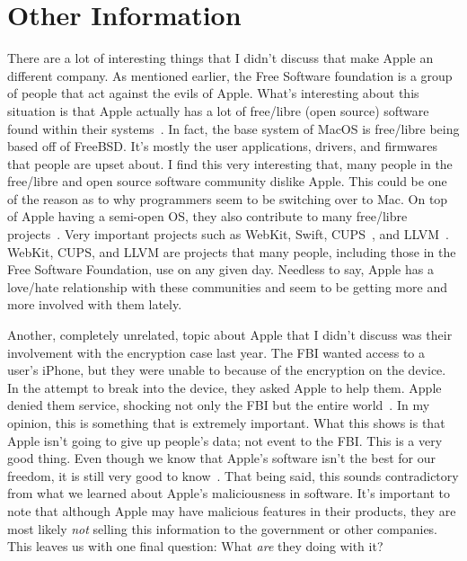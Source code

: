 \documentclass[12pt,a4paper,titlepage]{article}
\begin{document}
\section{Other Information}
There are a lot of interesting things that I didn't discuss that make Apple an
different company. As mentioned earlier, the Free Software foundation is a group
of people that act against the evils of Apple. What's interesting about this
situation is that Apple actually has a lot of free/libre (open source) software
found within their systems~\cite{open-apple}. In fact, the base system of MacOS
is free/libre being based off of FreeBSD. It's mostly the user applications,
drivers, and firmwares that people are upset about. I find this very interesting
that, many people in the free/libre and open source software community dislike
Apple. This could be one of the reason as to why programmers seem to be
switching over to Mac. On top of Apple having a semi-open OS, they also
contribute to many free/libre projects~\cite{open-apple}. Very important
projects such as WebKit, Swift, CUPS~\cite{cups}, and
LLVM~\cite{open-apple}. WebKit, CUPS, and LLVM are projects that many people,
including those in the Free Software Foundation, use on any given day. Needless
to say, Apple has a love/hate relationship with these communities and seem to be
getting more and more involved with them lately.

Another, completely unrelated, topic about Apple that I didn't discuss was their
involvement with the encryption case last year. The FBI wanted access to a
user's iPhone, but they were unable to because of the encryption on the
device. In the attempt to break into the device, they asked Apple to help
them. Apple denied them service, shocking not only the FBI but the entire
world~\cite{cnbc}. In my opinion, this is something that is extremely
important. What this shows is that Apple isn't going to give up people's data;
not event to the FBI. This is a very good thing. Even though we know that
Apple's software isn't the best for our freedom, it is still very good to
know~\cite{gnu}. That being said, this sounds contradictory from what we learned
about Apple's maliciousness in software. It's important to note that although
Apple may have malicious features in their products, they are most likely
\emph{not} selling this information to the government or other companies. This
leaves us with one final question: What \emph{are} they doing with it?

\newpage
\end{document}
